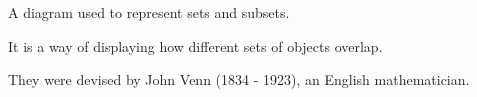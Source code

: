 A diagram used to represent sets and subsets.
\par
It is a way of displaying how different sets of objects overlap.
\par
They were devised by John Venn (1834 - 1923), an English mathematician.